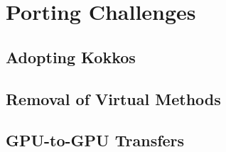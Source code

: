 \section{Porting Challenges}

\subsection{Adopting Kokkos}

\subsection{Removal of Virtual Methods}

\subsection{GPU-to-GPU Transfers}
